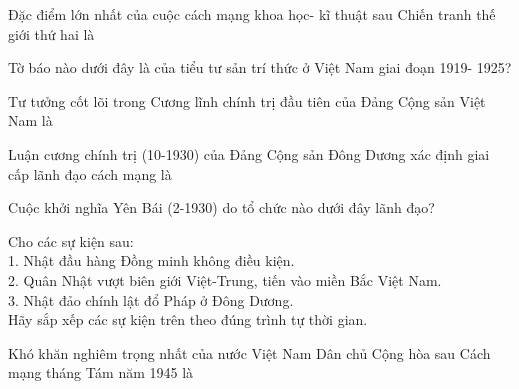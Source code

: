\documentclass[11pt]{article}
\begin{document}
\begin{vnmultiplechoice}[ rearrange=yes, keycolumns=3]
\begin{question} %
Đặc điểm lớn nhất của cuộc cách mạng khoa học- kĩ thuật sau Chiến tranh thế
giới thứ hai là
\datcot[4]
\bonpa
{}
{}
{}
{}
\end{question}

\begin{question} %
Tờ báo nào dưới đây là của tiểu tư sản trí thức ở Việt Nam giai đoạn 1919-
1925?
\datcot
\bonpa
{}
{}
{}
{}
\end{question}

\begin{question} %
Tư tưởng cốt lõi trong Cương lĩnh chính trị đầu tiên của Đảng Cộng sản Việt
Nam là
\datcot[2]
\bonpa
{}
{}
{}
{}
\end{question}
\begin{question} %
 Luận cương chính trị (10-1930) của Đảng Cộng sản Đông Dương xác định giai
cấp lãnh đạo cách mạng là
\datcot
\bonpa
{}
{}
{}
{}
\end{question}

\begin{question} %
Cuộc khởi nghĩa Yên Bái (2-1930) do tổ chức nào dưới đây lãnh đạo?
\datcot
\bonpa
{}
{}
{}
{}
\end{question}

\begin{question} %
Cho các sự kiện sau:\\
1. Nhật đầu hàng Đồng minh không điều kiện.\\
2. Quân Nhật vượt biên giới Việt-Trung, tiến vào miền Bắc Việt Nam.\\
3. Nhật đảo chính lật đổ Pháp ở Đông Dương.\\
Hãy sắp xếp các sự kiện trên theo đúng trình tự thời gian.
\datcot
\bonpa
{}
{}
{}
{}
\end{question}

\begin{question} %
Khó khăn nghiêm trọng nhất của nước Việt Nam Dân chủ Cộng hòa sau Cách
mạng tháng Tám năm 1945 là
\datcot
\bonpa
{}
{}
{}
{}
\end{question}


\end{vnmultiplechoice}
\end{document}
